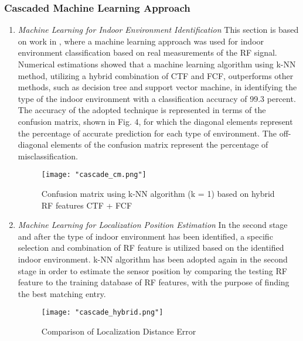    \subsubsection{Cascaded Machine Learning Approach}
        \begin{enumerate}
            \item \textit{Machine Learning for Indoor Environment Identification}
            This section is based on work in \cite{cascade_ref1}, \cite{cascade-ref2} where a machine learning approach was used for indoor environment classification based on real measurements of the RF signal. Numerical estimations showed that a machine learning algorithm using k-NN method, utilizing a hybrid combination of CTF and FCF, outperforms other methods, such as decision tree and support vector machine, in identifying the type of the indoor environment with a classification accuracy of 99.3 percent. The accuracy of the adopted technique is represented in terms of the confusion matrix, shown in Fig. 4, for which the diagonal elements represent the percentage of accurate prediction for each type of environment. The off-diagonal elements of the confusion matrix represent the percentage of misclassification.
            
            	\begin{figure}[H]
            		\captionsetup{justification=centering}
            		\texttt{[image: "cascade\_cm.png"]}
            		\caption{Confusion matrix using k-NN algorithm (k = 1) based on hybrid RF features CTF + FCF \cite[Fig. 2]{cascade}}
            	\end{figure}
            
            
            \item \textit{Machine Learning for Localization Position Estimation}
            In the second stage and after the type of indoor environment has been identified, a specific selection and combination of RF feature is utilized based on the identified indoor environment. k-NN algorithm has been adopted again in the second stage in order to estimate the sensor position by comparing the testing RF feature to the training database of RF features, with the purpose of finding the best matching entry.
    
            	\begin{figure}[H]
            		\captionsetup{justification=centering}
            		\texttt{[image: "cascade\_hybrid.png"]}
            		\caption{Comparison of Localization Distance Error \cite[Table. I]{cascade}}
            	\end{figure}
            	

\end{enumerate}
